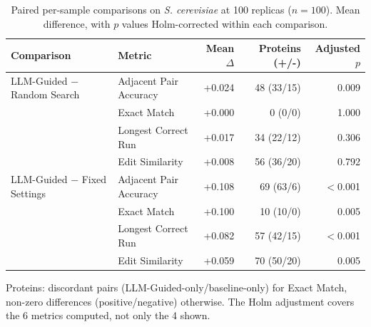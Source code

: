\begin{table}[!tb]
  \centering
  \caption{Paired per-sample comparisons on \textnormal{\textnormal{\textit{S. cerevisiae}}} at 100 replicas ($n=100$). Mean difference, with $p$ values Holm-corrected within each comparison.}
  \label{tab:paired_tests_yeast_r100}
  \begin{tabular}{llrrr}
    \toprule
    Comparison & Metric & Mean $\Delta$ & Proteins (+/-) & Adjusted $p$ \\
    \midrule
    LLM-Guided $-$ Random Search & Adjacent Pair Accuracy & +0.024 & 48 (33/15) & 0.009 \\
     & Exact Match & +0.000 & 0 (0/0) & 1.000 \\
     & Longest Correct Run & +0.017 & 34 (22/12) & 0.306 \\
     & Edit Similarity & +0.008 & 56 (36/20) & 0.792 \\
    \midrule
    LLM-Guided $-$ Fixed Settings & Adjacent Pair Accuracy & +0.108 & 69 (63/6) & $<$0.001 \\
     & Exact Match & +0.100 & 10 (10/0) & 0.005 \\
     & Longest Correct Run & +0.082 & 57 (42/15) & $<$0.001 \\
     & Edit Similarity & +0.059 & 70 (50/20) & 0.005 \\
    \bottomrule
  \end{tabular}
  \par\smallskip\footnotesize{Proteins: discordant pairs (LLM-Guided-only/baseline-only) for Exact Match, non-zero differences (positive/negative) otherwise. The Holm adjustment covers the 6 metrics computed, not only the 4 shown.}
\end{table}
